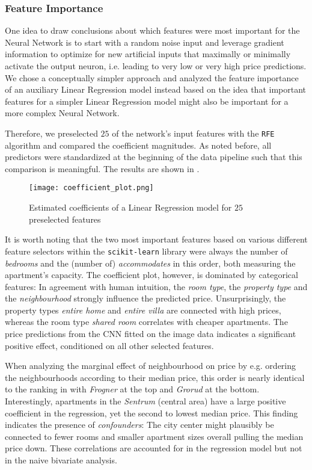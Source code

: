 \subsubsection{Feature Importance}

One idea to draw conclusions about which features were most important for the Neural Network is to start with a random noise input and leverage gradient information to optimize for new artificial inputs that maximally or minimally activate the output neuron, i.e. leading to very low or very high price predictions.
We chose a conceptually simpler approach and analyzed the feature importance of an auxiliary Linear Regression model instead based on the idea that important features for a simpler Linear Regression model might also be important for a more complex Neural Network.

Therefore, we preselected $25$ of the network's input features with the \texttt{RFE} algorithm and compared the coefficient magnitudes.
As noted before, all predictors were standardized at the beginning of the data pipeline such that this comparison is meaningful.
The results are shown in .

\begin{figure}[t]
  \centering
  \texttt{[image: coefficient\_plot.png]}
  \caption{Estimated coefficients of a Linear Regression model for $25$ preselected features}
  \label{fig:coefficient-plot}
\end{figure}

It is worth noting that the two most important features based on various different feature selectors within the \texttt{scikit-learn} library were always the number of \emph{bedrooms} and the (number of) \emph{accommodates} in this order, both measuring the apartment's capacity.
The coefficient plot, however, is dominated by categorical features:
In agreement with human intuition, the \emph{room type}, the \emph{property type} and the \emph{neighbourhood} strongly influence the predicted price.
Unsurprisingly, the property types \emph{entire home} and \emph{entire villa} are connected with high prices, whereas the room type \emph{shared room} correlates with cheaper apartments.
The price predictions from the CNN fitted on the image data indicates a significant positive effect, conditioned on all other selected features.

When analyzing the marginal effect of neighbourhood on price by e.g. ordering the neighbourhoods according to their median price, this order is nearly identical to the ranking in  with \emph{Frogner} at the top and \emph{Grorud} at the bottom.
Interestingly, apartments in the \emph{Sentrum} (central area) have a large positive coefficient in the regression, yet the second to lowest median price.
This finding indicates the presence of \emph{confounders}:
The city center might plausibly be connected to fewer rooms and smaller apartment sizes overall pulling the median price down.
These correlations are accounted for in the regression model but not in the naive bivariate analysis.

